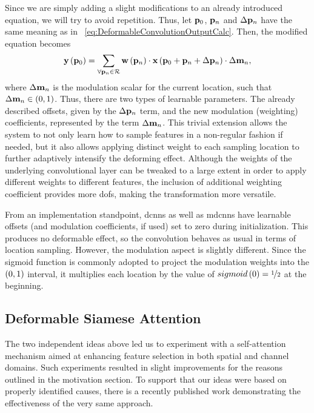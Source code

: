 Since we are simply adding a slight modifications to an already introduced equation, we will try to avoid repetition. Thus, let $\mathbf{p}_0$, $\mathbf{p}_n$ and $\Delta \mathbf{p}_n$ have the same meaning as in \eqtext{}~\ref{eq:DeformableConvolutionOutputCalc}. Then, the modified equation becomes
\begin{equation}
    \label{eq:ModulatedDeformableConvolutionOutputCalc}
    {\mathbf{y}} \left( \mathbf{p}_0 \right) =
    \sum_{\forall \mathbf{p}_n \in \mathcal{R}}
    {\mathbf{w}} \left( \mathbf{p}_n \right) \cdot {\mathbf{x}} \left( \mathbf{p}_0 + \mathbf{p}_n + \Delta \mathbf{p}_n \right) \cdot \Delta \mathbf{m}_n,
\end{equation}
where $\Delta \mathbf{m}_n$ is the modulation scalar for the current location, such that $\Delta \mathbf{m}_n \in \left( {0, 1} \right)$. Thus, there are two types of learnable parameters. The already described offsets, given by the $\Delta \mathbf{p}_n$ term, and the new modulation (weighting) coefficients, represented by the term $\Delta \mathbf{m}_n$. This trivial extension allows the system to not only learn how to sample features in a non-regular fashion if needed, but it also allows applying distinct weight to each sampling location to further adaptively intensify the deforming effect. Although the weights of the underlying convolutional layer can be tweaked to a large extent in order to apply different weights to different features, the inclusion of additional weighting coefficient provides more \glspl{dof}, making the transformation more versatile.

From an implementation standpoint, \glspl{dcnn} as well as \glspl{mdcnn} have learnable offsets (and modulation coefficients, if used) set to zero during initialization. This produces no deformable effect, so the convolution behaves as usual in terms of location sampling. However, the modulation aspect is slightly different. Since the sigmoid function is commonly adopted to project the modulation weights into the $\left( {0, 1} \right)$ interval, it multiplies each location by the value of ${sigmoid} \left( 0 \right) = \nicefrac{1}{2}$ at the beginning.

\subsection{Deformable Siamese Attention}
\label{ssec:DeformableSiameseAttention}

The two independent ideas above led us to experiment with a self-attention mechanism aimed at enhancing feature selection in both spatial and channel domains. Such experiments resulted in slight improvements for the reasons outlined in the motivation section. To support that our ideas were based on properly identified causes, there is a recently published work demonstrating the effectiveness of the very same approach.


